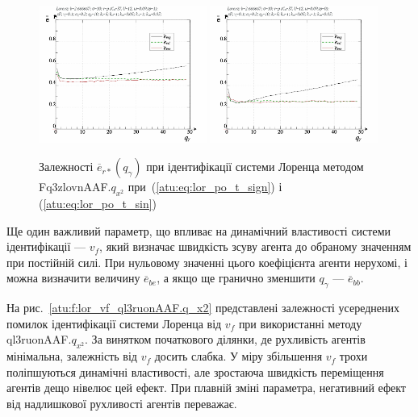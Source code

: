 \begin{figure}[ht!]
  \centerline{
    \includegraphics[width=0.49\textwidth]{p/cha/lor/Fq3zlovnAAF/lor_Fq3zlovnAAF_qx2-p_qg_e_sign.png}
    \hfill
    \includegraphics[width=0.49\textwidth]{p/cha/lor/Fq3zlovnAAF/lor_Fq3zlovnAAF_qx2-p_qg_e_sin.png}
  }
\caption{Залежності $ \overline{e}_{r *} (q_\gamma) $ при ідентифікації системи Лоренца методом Fq3zlovnAAF.$q_{x^2} $ при~(\ref{atu:eq:lor_po_t_sign}) і (\ref{atu:eq:lor_po_t_sin})}
\label{atu:f:lor_qg_Fq3zlovnAAF.q_x2}
\end{figure}


Ще один важливий параметр, що впливає на динамічний властивості
системи ідентифікації ---
$ v_f $, який визначає швидкість зсуву агента до обраному значенням
при постійній силі. При нульовому значенні цього коефіцієнта
агенти нерухомі, і можна визначити величину
$ \overline{e}_{be} $, а якщо ще гранично зменшити
$ q_\gamma $ ---
$ \overline{e}_{bb} $.



На рис.~\ref{atu:f:lor_vf_ql3ruonAAF.q_x2} представлені залежності усереднених
помилок ідентифікації системи Лоренца від
$ v_f $ при використанні методу
ql3ruonAAF.$q_{x^2}$.
За винятком початкового ділянки, де рухливість агентів
мінімальна, залежність від
$ v_f $ досить слабка. У міру збільшення
$ v_f $ трохи поліпшуються динамічні властивості, але зростаюча
швидкість переміщення агентів дещо нівелює цей ефект. При
плавній зміні параметра, негативний ефект від надлишкової
рухливості агентів переважає.

